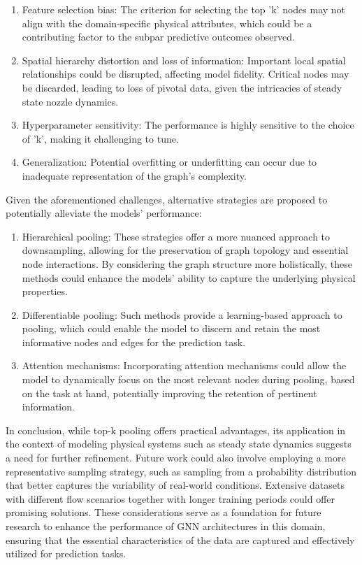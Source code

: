 \begin{enumerate}
\item Feature selection bias: The criterion for selecting the top 'k' nodes may not align with the domain-specific physical attributes, which could be a contributing factor to the subpar predictive outcomes observed.
\item Spatial hierarchy distortion and loss of information: Important local spatial relationships could be disrupted, affecting model fidelity. Critical nodes may be discarded, leading to loss of pivotal data, given the intricacies of steady state nozzle dynamics.
\item Hyperparameter sensitivity: The performance is highly sensitive to the choice of 'k', making it challenging to tune.
\item Generalization: Potential overfitting or underfitting can occur due to inadequate representation of the graph's complexity.
\end{enumerate}
Given the aforementioned challenges, alternative strategies are proposed to potentially alleviate the models' performance:
\begin{enumerate}
\item Hierarchical pooling: These strategies offer a more nuanced approach to downsampling, allowing for the preservation of graph topology and essential node interactions. By considering the graph structure more holistically, these methods could enhance the models' ability to capture the underlying physical properties.
\item Differentiable pooling: Such methods provide a learning-based approach to pooling, which could enable the model to discern and retain the most informative nodes and edges for the prediction task.
\item Attention mechanisms: Incorporating attention mechanisms could allow the model to dynamically focus on the most relevant nodes during pooling, based on the task at hand, potentially improving the retention of pertinent information.
\end{enumerate}
In conclusion, while top-k pooling offers practical advantages, its application in the context of modeling physical systems such as steady state dynamics suggests a need for further refinement. Future work could also involve employing a more representative sampling strategy, such as sampling from a probability distribution that better captures the variability of real-world conditions. Extensive datasets with different flow scenarios together with longer training periods could offer promising solutions. These considerations serve as a foundation for future research to enhance the performance of GNN architectures in this domain, ensuring that the essential characteristics of the data are captured and effectively utilized for prediction tasks.
